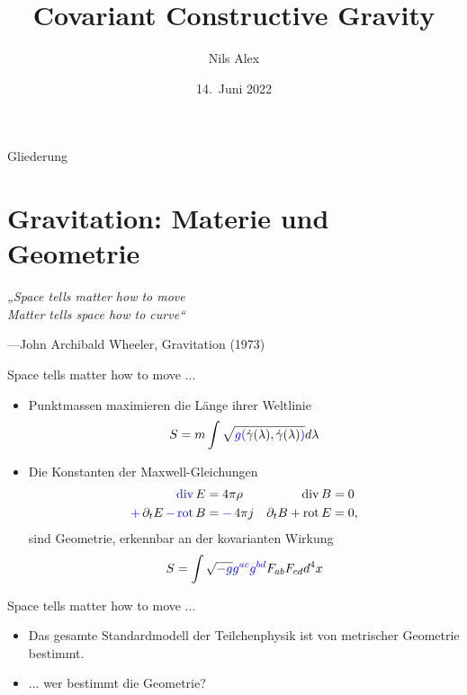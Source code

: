 \documentclass{beamer}
\title{Covariant Constructive Gravity}
\date{14.\ Juni 2022}
\author{Nils Alex}
\institute{FAU Erlangen-Nürnberg}
\begin{document}
    \maketitle

    \begin{frame}{Gliederung}
        \tableofcontents
    \end{frame}


    \section{Gravitation: Materie und Geometrie}\label{sec:materie-und-geometrie}

    \begin{frame}{}
        \Large
        \textit{„Space tells matter how to move \\
        Matter tells space how to curve“}

        \normalsize
        ---John Archibald Wheeler, Gravitation (1973)
    \end{frame}

    \begin{frame}{Space tells matter how to move ...}
        \begin{itemize}
            \item{Punktmassen maximieren die {\color{blue}Länge} ihrer Weltlinie \\
                \[ S = m \int \sqrt{{\color{blue}g(}\dot\gamma(\lambda),\dot\gamma(\lambda){\color{blue})}} d\lambda \]} \pause
            \item{Die Konstanten der Maxwell-Gleichungen
                \begin{align*}
                    \mathop{\color{blue}\operatorname{div}} E &= 4\pi \rho & \operatorname{div} B &= 0 \\
                    \mathop{\color{blue}+} \partial_t E \mathop{\color{blue}-} \mathop{\color{blue}\operatorname{rot}} B &= \mathop{\color{blue}-}4\pi j & \partial_t B + \operatorname{rot} E &= 0,
                \end{align*}
                sind Geometrie, erkennbar an der kovarianten Wirkung
                \[
                    S = \int \sqrt{-\color{blue}g}{\color{blue}g^{ac}g^{bd}} F_{ab} F_{cd} d^4 x
                \]
            }
        \end{itemize}
    \end{frame}

    \begin{frame}{Space tells matter how to move ...}
        \begin{itemize}
            \item{Das gesamte Standardmodell der Teilchenphysik ist von metrischer Geometrie bestimmt.} \pause
            \item{... wer bestimmt die Geometrie?}
        \end{itemize}
    \end{frame}
\end{document}
